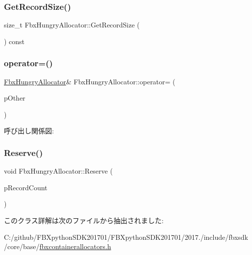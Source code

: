 \subsubsection{\texorpdfstring{Get\+Record\+Size()}{GetRecordSize()}}
{\footnotesize\ttfamily size\+\_\+t Fbx\+Hungry\+Allocator\+::\+Get\+Record\+Size (\begin{DoxyParamCaption}{ }\end{DoxyParamCaption}) const}

\mbox{\label{class_fbx_hungry_allocator_a692a8e4e268a60d82be5469e6e8c232f}} 
\subsubsection{\texorpdfstring{operator=()}{operator=()}}
{\footnotesize\ttfamily \hyperlink{class_fbx_hungry_allocator}{Fbx\+Hungry\+Allocator}\& Fbx\+Hungry\+Allocator\+::operator= (\begin{DoxyParamCaption}\item[{const \hyperlink{class_fbx_hungry_allocator}{Fbx\+Hungry\+Allocator} \&}]{p\+Other }\end{DoxyParamCaption})}

呼び出し関係図\+:
\mbox{\label{class_fbx_hungry_allocator_a8aeb6180f5d6ce87b57d0505520144b5}} 
\subsubsection{\texorpdfstring{Reserve()}{Reserve()}}
{\footnotesize\ttfamily void Fbx\+Hungry\+Allocator\+::\+Reserve (\begin{DoxyParamCaption}\item[{const size\+\_\+t}]{p\+Record\+Count }\end{DoxyParamCaption})}



このクラス詳解は次のファイルから抽出されました\+:\begin{DoxyCompactItemize}
\item 
C\+:/github/\+F\+B\+Xpython\+S\+D\+K201701/\+F\+B\+Xpython\+S\+D\+K201701/2017./include/fbxsdk/core/base/\hyperlink{fbxcontainerallocators_8h}{fbxcontainerallocators.\+h}\end{DoxyCompactItemize}
